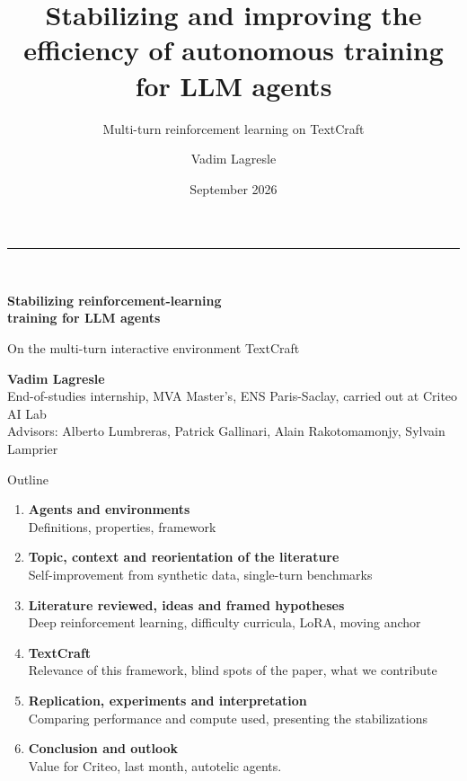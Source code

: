 \documentclass[aspectratio=169,10pt]{beamer}
\title{Stabilizing and improving the efficiency of autonomous training for LLM agents}
\subtitle{Multi-turn reinforcement learning on TextCraft}
\author{Vadim Lagresle}
\institute{Criteo AI Lab \;·\; Internship defense}
\date{September 2026}
\begin{document}
{
\begin{frame}[plain]
  \vspace{0.5cm}
  \begin{minipage}{0.88\textwidth}
    {\color{crOrange}\rule{2.4cm}{3pt}}\\[0.4cm]
    {\color{white}\fontsize{20}{24}\selectfont\bfseries Stabilizing reinforcement-learning\\ training for LLM agents\par}
    \vspace{0.45cm}
    {\color{white}\large On the multi-turn interactive environment TextCraft\par}
    \vspace{1.1cm}
    {\color{white}\bfseries Vadim Lagresle}\\[0.1cm]
    {\color{crMid}\small End-of-studies internship, MVA Master's, ENS Paris-Saclay, carried out at Criteo AI Lab}\\[0.1cm]
    {\color{crMid}\small Advisors: Alberto Lumbreras, Patrick Gallinari, Alain Rakotomamonjy, Sylvain Lamprier}\\[0.1cm]
  \end{minipage}
  \vfill
  \vspace{0.2cm}
\end{frame}
}

\begin{frame}{Outline}
\begin{enumerate}\setlength{\itemsep}{0.12cm}
  \item {\large\textbf{Agents and environments}}\\
        {\color{crMid}\small Definitions, properties, framework}
  \item {\large\textbf{Topic, context and reorientation of the literature}}\\
        {\color{crMid}\small Self-improvement from synthetic data, single-turn benchmarks}
  \item {\large\textbf{Literature reviewed, ideas and framed hypotheses}}\\
        {\color{crMid}\small Deep reinforcement learning, difficulty curricula, LoRA, moving anchor}
  \item {\large\textbf{TextCraft}}\\
        {\color{crMid}\small Relevance of this framework, blind spots of the paper, what we contribute}
  \item {\large\textbf{Replication, experiments and interpretation}}\\
        {\color{crMid}\small Comparing performance and compute used, presenting the stabilizations}
  \item {\large\textbf{Conclusion and outlook}}\\
        {\color{crMid}\small Value for Criteo, last month, autotelic agents.}
\end{enumerate}
\end{frame}
\end{document}
